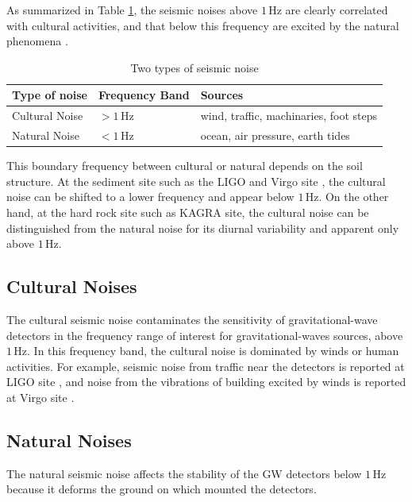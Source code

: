 As summarized in Table \ref{tb:31}, the seismic noises above $1\,\mathrm{Hz}$ are clearly correlated with cultural activities, and that below this frequency are excited by the natural phenomena \cite{bonnefoy2006nature}.
\begin{table}[h] 
  \begin{center}
    \caption{Two types of seismic noise}\label{tb:31}
    \begin{tabular}{lll} 
      \hline      
      Type of noise & Frequency Band & Sources \\ \hline \hline
      Cultural Noise & $> 1\,\mathrm{Hz}$ & wind, traffic, machinaries, foot steps\\
      Natural Noise  & $< 1\,\mathrm{Hz}$ & ocean, air pressure, earth tides\\
    \end{tabular}
  \end{center}
\end{table}

This boundary frequency between cultural or natural depends on the soil structure. At the sediment site such as the LIGO \cite{Daw_2004} and Virgo site \cite{Beker_2012}, the cultural noise can be shifted to a lower frequency and appear below $1\,\mathrm{Hz}$. On the other hand, at the hard rock site such as KAGRA site, the cultural noise can be distinguished from the natural noise for its diurnal variability and apparent only above $1\,\mathrm{Hz}$.


\subsection{Cultural Noises} \label{sec:321}
The cultural seismic noise contaminates the sensitivity of gravitational-wave detectors in the frequency range of interest for gravitational-waves sources, above $1\,\mathrm{Hz}$. In this frequency band, the cultural noise is dominated by winds or human activities. For example, seismic noise from traffic near the detectors is reported at LIGO site \cite{schofield2000source}, and noise from the vibrations of building excited by winds is reported at Virgo site \cite{acernese2004properties}. 

\subsection{Natural Noises} \label{sec:322}
The natural seismic noise affects the stability of the GW detectors below $1\,\mathrm{Hz}$ because it deforms the ground on which mounted the detectors.


